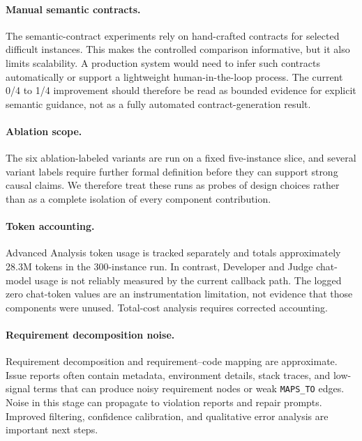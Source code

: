 \documentclass[11pt]{article}
\begin{document}
\paragraph{Manual semantic contracts.}
The semantic-contract experiments rely on hand-crafted contracts for selected difficult instances.  This makes the controlled comparison informative, but it also limits scalability.  A production system would need to infer such contracts automatically or support a lightweight human-in-the-loop process.  The current 0/4 to 1/4 improvement should therefore be read as bounded evidence for explicit semantic guidance, not as a fully automated contract-generation result.

\paragraph{Ablation scope.}
The six ablation-labeled variants are run on a fixed five-instance slice, and several variant labels require further formal definition before they can support strong causal claims.  We therefore treat these runs as probes of design choices rather than as a complete isolation of every component contribution.

\paragraph{Token accounting.}
Advanced Analysis token usage is tracked separately and totals approximately 28.3M tokens in the 300-instance run.  In contrast, Developer and Judge chat-model usage is not reliably measured by the current callback path.  The logged zero chat-token values are an instrumentation limitation, not evidence that those components were unused.  Total-cost analysis requires corrected accounting.

\paragraph{Requirement decomposition noise.}
Requirement decomposition and requirement--code mapping are approximate.  Issue reports often contain metadata, environment details, stack traces, and low-signal terms that can produce noisy requirement nodes or weak \texttt{MAPS\_TO} edges.  Noise in this stage can propagate to violation reports and repair prompts.  Improved filtering, confidence calibration, and qualitative error analysis are important next steps.
\end{document}
